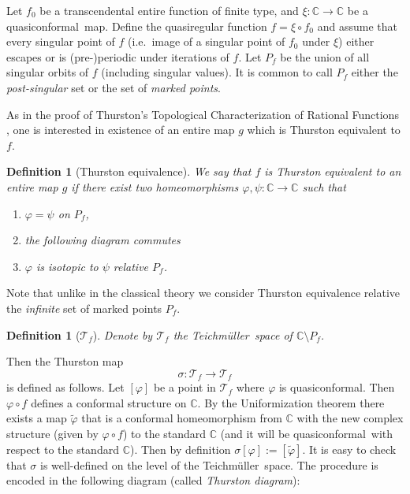 \documentclass[10pt,reqno,a4paper]{amsart}
\numberwithin{figure}{section}
\numberwithin{equation}{section}
\newtheorem{defn}[thm]{Definition}
\newcommand{\tei}{Teichm\"uller}
\newcommand{\qc}{quasiconformal}
\begin{document}
Let $f_0$ be a transcendental entire function of finite type, and $\xi:\mathbb{C}\to\mathbb{C}$ be a \qc\ map. Define the quasiregular function $f=\xi\circ f_0$ and assume that every singular point of $f$ (i.e.\ image of a singular point of $f_0$ under $\xi$) either escapes or is (pre-)periodic under iterations of $f$. Let $P_f$ be the union of all singular orbits of $f$ (including singular values). It is common to call $P_f$ either the \emph{post-singular} set or the set of \emph{marked points}.

As in the proof of Thurston's Topological Characterization of Rational Functions \cite{DH}, one is interested in existence of an entire map $g$ which is Thurston equivalent to $f$.

\begin{defn}[Thurston equivalence]
	We say that $f$ is \emph{Thurston equivalent} to an entire map $g$ if there exist two homeomorphisms $\varphi,\psi:\mathbb{C}\to\mathbb{C}$ such that
	\begin{enumerate}
		\item $\varphi=\psi$ on $P_f$,
		\item the following diagram commutes
		
		\item $\varphi$ is isotopic to $\psi$ relative $P_f$.
	\end{enumerate}
\end{defn}

Note that unlike in the classical theory we consider Thurston equivalence relative the \emph{infinite} set of marked points $P_f$.

\begin{defn}[$\mathcal{T}_f$]
	Denote by $\mathcal{T}_f$ the \tei\ space of $\mathbb{C}\setminus P_f$.
\end{defn}

Then the Thurston map $$\sigma:\mathcal{T}_f\to\mathcal{T}_f$$ is defined as follows. Let $[\varphi]$ be a point in $\mathcal{T}_f$  where $\varphi$ is quasiconformal. Then $\varphi\circ f$ defines a conformal structure on $\mathbb{C}$. By the Uniformization theorem there exists a map $\tilde{\varphi}$ that is a conformal homeomorphism from $\mathbb{C}$ with the new complex structure (given by $\varphi\circ f$) to the standard $\mathbb{C}$ (and it will be \qc\ with respect to the standard $\mathbb{C}$). Then by definition $\sigma[\varphi]:=[\tilde{\varphi}]$. It is easy to check that $\sigma$ is well-defined on the level of the \tei\ space. The procedure is encoded in the following diagram (called \emph{Thurston diagram}):
\end{document}
